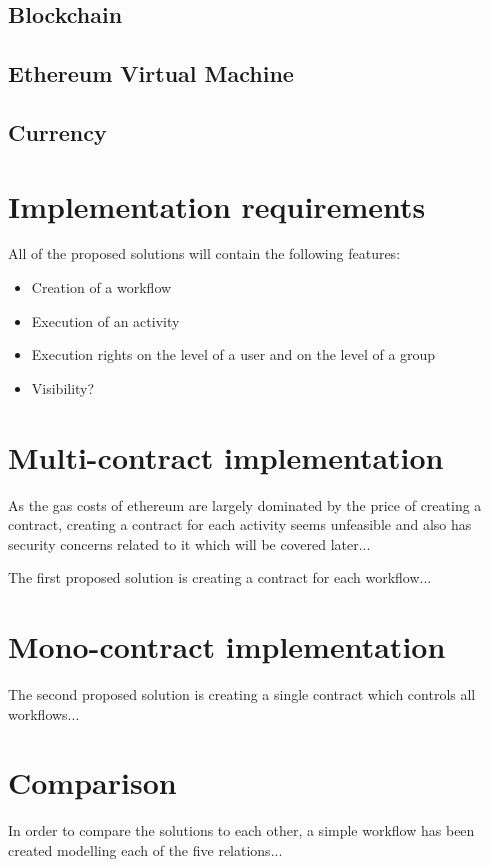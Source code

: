 \documentclass{article}
\begin{document}
		\subsection{Blockchain}

		\subsection{Ethereum Virtual Machine}

		\subsection{Currency}

	\section{Implementation requirements}

	All of the proposed solutions will contain the following features:
	\begin{itemize}
		\item Creation of a workflow
		\item Execution of an activity
		\item Execution rights on the level of a user and on the level of a group
		\item Visibility?
	\end{itemize}


	\section{Multi-contract implementation}

	As the gas costs of ethereum are largely dominated by the price of creating a contract, creating a contract for each activity seems unfeasible and also has security concerns related to it which will be covered later...

	The first proposed solution is creating a contract for each workflow...

	\section{Mono-contract implementation}

	The second proposed solution is creating a single contract which controls all workflows...

	\section{Comparison}
	In order to compare the solutions to each other, a simple workflow has been created modelling each of the five relations...
\end{document}
